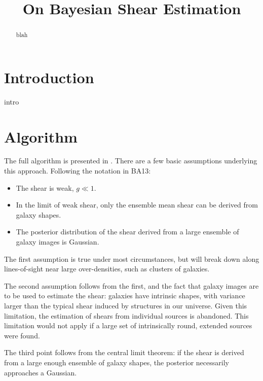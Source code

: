 \documentclass[12pt,preprint]{aastex}
\begin{document}
\title{On Bayesian Shear Estimation}



\begin{abstract}

blah

\end{abstract}

\section{Introduction} \label{sec:intro}

intro

\section{Algorithm} \label{sec:algo}

The full algorithm is presented in \citet[][BA13]{ba13}.  There are a few basic
assumptions underlying this approach.  Following the notation in BA13:

\begin{itemize}

    \item The shear is weak, $g \ll 1$.

    \item In the limit of weak shear, only the ensemble mean shear can be
        derived from galaxy shapes.

    \item The posterior distribution of the shear derived from a large ensemble
        of galaxy images is Gaussian.


\end{itemize}

The first assumption is true under most circumstances, but will break down
along lines-of-sight near large over-densities, such as clusters of galaxies.

The second assumption follows from the first, and the fact that galaxy images
are to be used to estimate the shear: galaxies have intrinsic shapes, with
variance larger than the typical shear induced by structures in our universe.
Given this limitation, the estimation of shears from individual sources is
abandoned.  This limitation would not apply if a large set of intrinsically
round, extended sources were found.

The third point follows from the central limit theorem: if the shear is derived
from a large enough ensemble of galaxy shapes, the posterior necessarily
approaches a Gaussian.
\end{document}
